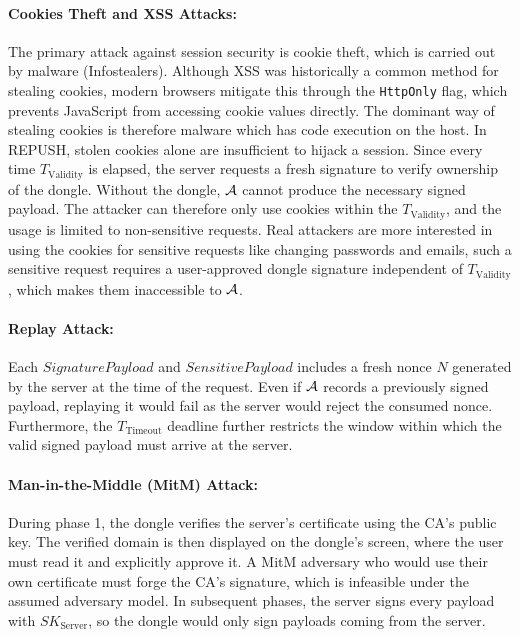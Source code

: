 \paragraph{Cookies Theft and XSS Attacks:} The primary attack against session security is cookie theft, which is carried out by malware (Infostealers). Although XSS was historically a common method for stealing cookies, modern browsers mitigate this through the \verb|HttpOnly| flag, which prevents JavaScript from accessing cookie values directly. The dominant way of stealing cookies is therefore malware which has code execution on the host. In REPUSH, stolen cookies alone are insufficient to hijack a session. Since every time $T_\text{Validity}$ is elapsed, the server requests a fresh signature to verify ownership of the dongle. Without the dongle, $\mathcal{A}$ cannot produce the necessary signed payload. The attacker can therefore only use cookies within the $T_\text{Validity}$, and the usage is limited to non-sensitive requests. Real attackers are more interested in using the cookies for sensitive requests like changing passwords and emails, such a sensitive request requires a user-approved dongle signature independent of $T_\text{Validity}$, which makes them inaccessible to $\mathcal{A}$.

\paragraph{Replay Attack:}
Each $SignaturePayload$ and $SensitivePayload$ includes a fresh nonce $N$ generated by the server at the time of the request. Even if $\mathcal{A}$ records a previously signed payload, replaying it would fail as the server would reject the consumed nonce. Furthermore, the $T_\text{Timeout}$ deadline further restricts the window within which the valid signed payload must arrive at the server.

\paragraph{Man-in-the-Middle (MitM) Attack:}
During phase 1, the dongle verifies the server's certificate using the CA's public key. The verified domain is then displayed on the dongle's screen, where the user must read it and explicitly approve it. A MitM adversary who would use their own certificate must forge the CA's signature, which is infeasible under the assumed adversary model. In subsequent phases, the server signs every payload with $SK_\text{Server}$, so the dongle would only sign payloads coming from the server.

